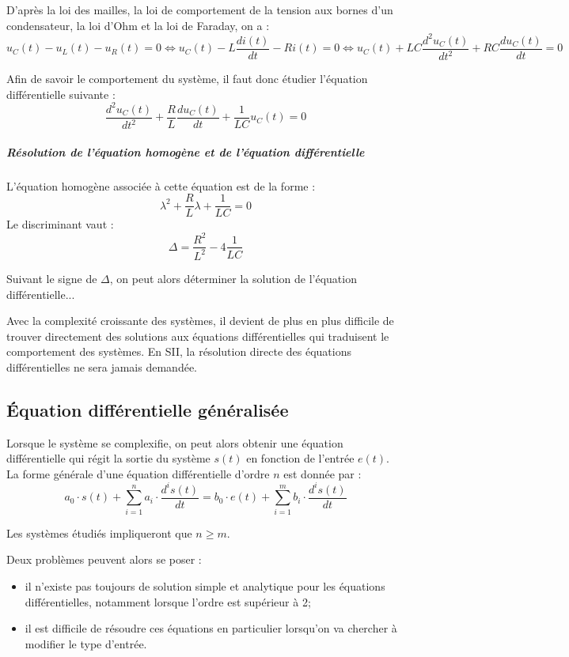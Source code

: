 \documentclass[11pt,oneside]{article}
\begin{document}
D'après la loi des mailles, la loi de comportement de la tension aux bornes d'un condensateur, la loi d'Ohm et la loi de Faraday, on a : 
$$
u_C(t)-u_L(t)-u_R(t)=0 
\Longleftrightarrow u_C(t) - L\dfrac{di(t)}{dt} -Ri(t)=0 
\Longleftrightarrow u_C(t) + LC\dfrac{d^2u_C(t)}{dt^2} +RC \dfrac{du_C(t)}{dt}=0 
$$


Afin de savoir le comportement du système, il faut donc étudier l'équation différentielle suivante :  
$$
\dfrac{d^2u_C(t)}{dt^2} +\dfrac{R}{L} \dfrac{du_C(t)}{dt} + \dfrac{1}{LC}u_C(t)=0 
$$

\subparagraph*{Résolution de l'équation homogène et de l'équation différentielle}
L'équation homogène associée à cette équation est de la forme : 
$$
\lambda^2 +\dfrac{R}{L} \lambda + \dfrac{1}{LC}=0 
$$
Le discriminant vaut : 
$$
\Delta = \dfrac{R^2}{L^2}-4\dfrac{1}{LC}
$$

Suivant le signe de $\Delta$, on peut alors déterminer la solution de l'équation différentielle...


\begin{obj}
Avec la complexité croissante des systèmes, il devient de plus en plus difficile de trouver directement des solutions aux équations différentielles qui traduisent le comportement des systèmes. En SII, la résolution directe des équations différentielles ne sera jamais demandée.
\end{obj}

\subsection{Équation différentielle généralisée}
Lorsque le système se complexifie, on peut alors obtenir une équation différentielle qui régit la sortie du système $s(t)$ en fonction de l'entrée $e(t)$. La forme générale d'une équation différentielle d'ordre $n$ est donnée par :
$$
a_0 \cdot s(t)  + \sum\limits_{i=1}^n a_i \cdot \dfrac{d^i s(t)}{dt}
= b_0 \cdot e(t)  + \sum\limits_{i=1}^m  b_i \cdot\dfrac{d^i s(t)}{dt}
$$

\begin{rem}
Les systèmes étudiés impliqueront que $n\geq m$.
\end{rem}

Deux problèmes peuvent alors se poser :
\begin{itemize}
\item il n'existe pas toujours de solution simple et analytique pour les équations différentielles, notamment lorsque l'ordre est supérieur à 2;
\item il est difficile de résoudre ces équations en particulier lorsqu'on va chercher à modifier le type d'entrée.
\end{itemize}
\end{document}
